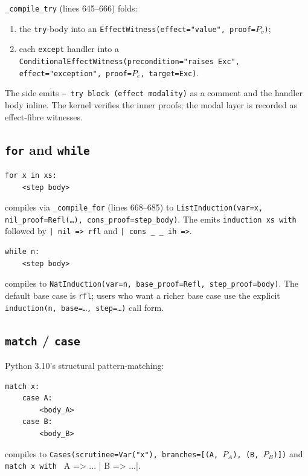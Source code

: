 \texttt{\_compile\_try} (lines 645--666) folds:
\begin{enumerate}[leftmargin=1.7em]
  \item the \texttt{try}-body into an
    \texttt{EffectWitness(effect="value", proof=$P_v$)};
  \item each \texttt{except} handler into a
    \texttt{ConditionalEffectWitness(precondition="raises Exc",
    effect="exception", proof=$P_e$, target=Exc)}.
\end{enumerate}
The \Lean{} side emits \texttt{-- try block (effect modality)} as
a comment and the handler body inline.  The kernel verifies the
inner proofs; the modal layer is recorded as effect-fibre witnesses.

\subsection{\texttt{for} and \texttt{while}}

\begin{lstlisting}[language=psdl]
for x in xs:
    <step body>
\end{lstlisting}

compiles via \texttt{\_compile\_for} (lines 668--685) to
\texttt{ListInduction(var=x, nil\_proof=Refl(\dots),
cons\_proof=step\_body)}.  The \Lean{} emits
\verb|induction xs with | followed by \texttt{| nil => rfl} and
\texttt{| cons \_ \_ ih =>}.

\begin{lstlisting}[language=psdl]
while n:
    <step body>
\end{lstlisting}

compiles to \texttt{NatInduction(var=n, base\_proof=Refl,
step\_proof=body)}.  The default base case is \texttt{rfl}; users
who want a richer base case use the explicit
\texttt{induction(n, base=\dots, step=\dots)} call form.

\subsection{\texttt{match} / \texttt{case}}

Python 3.10's structural pattern-matching:

\begin{lstlisting}[language=psdl]
match x:
    case A:
        <body_A>
    case B:
        <body_B>
\end{lstlisting}

compiles to \texttt{Cases(scrutinee=Var("x"), branches=[(A, $P_A$),
(B, $P_B$)])} and \Lean{} \verb|match x with | \verb|| A => ... | B => ...|.

